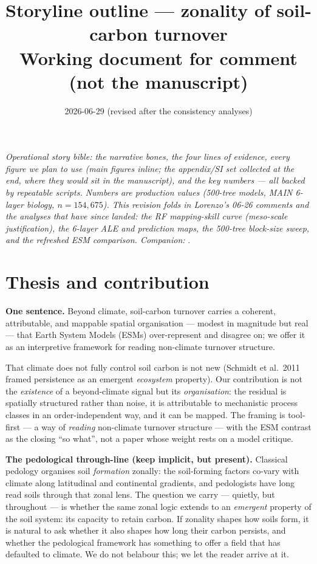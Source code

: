 \documentclass[11pt]{article}
\title{\vspace{-1.2cm}\textbf{Storyline outline --- zonality of soil-carbon turnover}\\[2pt]
\large Working document for comment (not the manuscript)}
\author{}
\date{2026-06-29 (revised after the consistency analyses)}
\DeclareRobustCommand{\fpath}[1]{{\small\texttt{\detokenize{#1}}}}
\begin{document}
\maketitle
\vspace{-0.8cm}

\noindent\textit{Operational story bible: the narrative bones, the four lines of
evidence, every figure we plan to use (main figures inline; the appendix/SI set
collected at the end, where they would sit in the manuscript), and the key numbers
--- all backed by repeatable scripts. Numbers are production values (500-tree
models, MAIN 6-layer biology, $n=154{,}675$). This revision folds in Lorenzo's
06-26 comments and the analyses that have since landed: the RF mapping-skill curve
(meso-scale justification), the 6-layer ALE and prediction maps, the 500-tree
block-size sweep, and the refreshed ESM comparison. Companion:}
\fpath{results_reconciliation_2026-06-26.md}.

\section{Thesis and contribution}

\textbf{One sentence.} Beyond climate, soil-carbon turnover carries a coherent,
attributable, and mappable spatial organisation --- modest in magnitude but real
--- that Earth System Models (ESMs) over-represent and disagree on; we offer it as
an interpretive framework for reading non-climate turnover structure.

That climate does not fully control soil carbon is not new (Schmidt et al.\ 2011
framed persistence as an emergent \emph{ecosystem} property). Our contribution is
not the \emph{existence} of a beyond-climate signal but its \emph{organisation}:
the residual is spatially structured rather than noise, it is attributable to
mechanistic process classes in an order-independent way, and it can be mapped. The
framing is tool-first --- a way of \emph{reading} non-climate turnover structure
--- with the ESM contrast as the closing ``so what'', not a paper whose weight
rests on a model critique.

\textbf{The pedological through-line (keep implicit, but present).} Classical
pedology organises soil \emph{formation} zonally: the soil-forming factors co-vary
with climate along latitudinal and continental gradients, and pedologists have long
read soils through that zonal lens. The question we carry --- quietly, but
throughout --- is whether the same zonal logic extends to an \emph{emergent}
property of the soil system: its capacity to retain carbon. If zonality shapes how
soils form, it is natural to ask whether it also shapes how long their carbon
persists, and whether the pedological framework has something to offer a field that
has defaulted to climate. We do not belabour this; we let the reader arrive at it.
\end{document}

